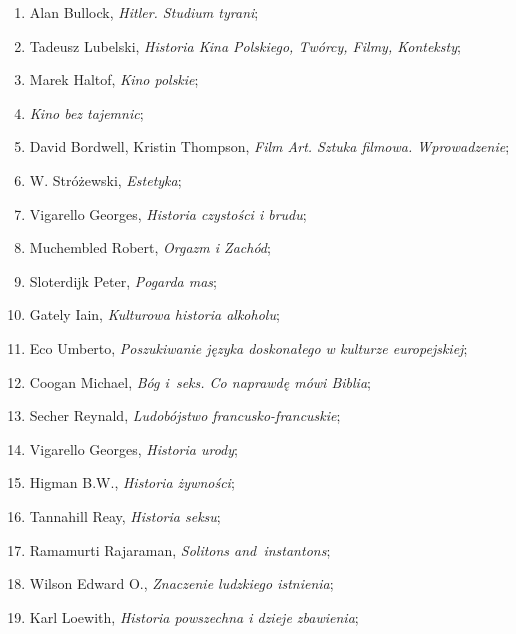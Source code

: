 \documentclass[a4paper,11pt]{article}
\begin{document}
\begin{enumerate}
\item Alan Bullock, \textit{Hitler. Studium tyrani};

\item Tadeusz Lubelski, \textit{Historia Kina Polskiego, Twórcy, Filmy,
    Konteksty};

\item Marek Haltof, \textit{Kino polskie};

\item \textit{Kino bez tajemnic};

\item David Bordwell, Kristin Thompson, \textit{Film Art. Sztuka
    filmowa. Wprowadzenie};

\item W. Stróżewski, \textit{Estetyka};

\item Vigarello Georges, \textit{Historia czystości i brudu};

\item Muchembled Robert, \textit{Orgazm i Zachód};

\item Sloterdijk Peter, \textit{Pogarda mas};

\item Gately Iain, \textit{Kulturowa historia alkoholu};

\item Eco Umberto, \textit{Poszukiwanie języka doskonałego w kulturze
    europejskiej};

\item Coogan Michael, \textit{Bóg i~seks. Co naprawdę mówi Biblia};

\item Secher Reynald, \textit{Ludobójstwo francusko-francuskie};

\item Vigarello Georges, \textit{Historia urody};

\item Higman B.W., \textit{Historia żywności};

\item Tannahill Reay, \textit{Historia seksu};

\item Ramamurti Rajaraman, \textit{Solitons and~instantons};

\item Wilson Edward O., \textit{Znaczenie ludzkiego istnienia};

\item Karl Loewith, \textit{Historia powszechna i dzieje zbawienia};


\end{enumerate}
\end{document}

